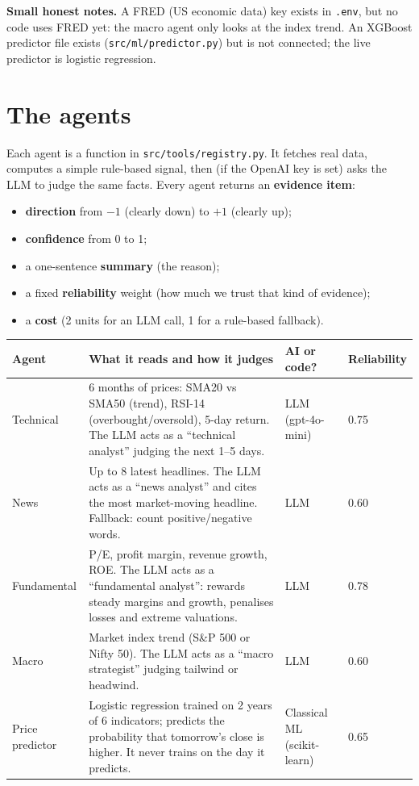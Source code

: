 \documentclass[10.5pt,a4paper]{article}
\newcommand{\file}[1]{\texttt{#1}}
\begin{document}
\begin{warnbox}
\textbf{Small honest notes.} A FRED (US economic data) key exists in \file{.env}, but no code uses FRED yet: the macro agent only looks at the index trend. An XGBoost predictor file exists (\file{src/ml/predictor.py}) but is not connected; the live predictor is logistic regression.
\end{warnbox}

\clearpage
\section{The agents}

Each agent is a function in \file{src/tools/registry.py}. It fetches real data, computes a simple rule-based signal, then (if the OpenAI key is set) asks the LLM to judge the same facts. Every agent returns an \textbf{evidence item}:
\begin{itemize}
\item \textbf{direction} from $-1$ (clearly down) to $+1$ (clearly up);
\item \textbf{confidence} from 0 to 1;
\item a one-sentence \textbf{summary} (the reason);
\item a fixed \textbf{reliability} weight (how much we trust that kind of evidence);
\item a \textbf{cost} (2 units for an LLM call, 1 for a rule-based fallback).
\end{itemize}

{\small
\begin{tabularx}{\linewidth}{L{2.4cm}YL{2.0cm}L{1.6cm}}
\toprule
\textbf{Agent} & \textbf{What it reads and how it judges} & \textbf{AI or code?} & \textbf{Reliability} \\
\midrule
Technical & 6 months of prices: SMA20 vs SMA50 (trend), RSI-14 (overbought/oversold), 5-day return. The LLM acts as a ``technical analyst'' judging the next 1--5 days. & LLM (gpt-4o-mini) & 0.75 \\
News & Up to 8 latest headlines. The LLM acts as a ``news analyst'' and cites the most market-moving headline. Fallback: count positive/negative words. & LLM & 0.60 \\
Fundamental & P/E, profit margin, revenue growth, ROE. The LLM acts as a ``fundamental analyst'': rewards steady margins and growth, penalises losses and extreme valuations. & LLM & 0.78 \\
Macro & Market index trend (S\&P 500 or Nifty 50). The LLM acts as a ``macro strategist'' judging tailwind or headwind. & LLM & 0.60 \\
Price predictor & Logistic regression trained on 2 years of 6 indicators; predicts the probability that tomorrow's close is higher. It never trains on the day it predicts. & Classical ML (scikit-learn) & 0.65 \\
\bottomrule
\end{tabularx}}
\end{document}
